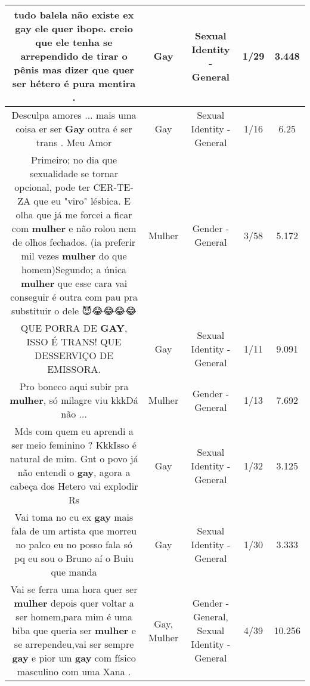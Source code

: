 \documentclass[11pt]{article}
\newlength\mylength
\begin{document}
\begin{center}
\begin{longtable}{|C{.65\mylength}|C{.30\mylength}|C{.12\mylength}|C{.12\mylength}|C{.12\mylength}|}
  \small tudo balela não existe ex \textbf{gay} ele quer ibope. creio que ele tenha se arrependido de tirar o pênis mas dizer que quer ser hétero é pura mentira .\normalsize   & Gay & Sexual Identity - General & 1/29 & 3.448 \\  \hline
  \small Desculpa amores ... mais uma coisa  er ser \textbf{Gay} outra é  ser trans . Meu Amor\normalsize   & Gay & Sexual Identity - General & 1/16 & 6.25 \\  \hline
  \small Primeiro; no dia que sexualidade se tornar opcional, pode ter CER-TE-ZA que eu "viro" lésbica. E olha que já me forcei a ficar com \textbf{mulher} e não rolou nem de olhos fechados. (ia preferir mil vezes \textbf{mulher} do que homem)Segundo; a única \textbf{mulher} que esse cara vai conseguir é outra com pau pra substituir o dele 😈😂😂😂😂\normalsize   & Mulher & Gender - General & 3/58 & 5.172 \\  \hline
  \small QUE PORRA DE \textbf{GAY}, ISSO É TRANS! QUE DESSERVIÇO DE EMISSORA.\normalsize   & Gay & Sexual Identity - General & 1/11 & 9.091 \\  \hline
  \small Pro boneco aqui subir pra \textbf{mulher}, só milagre viu kkkDá não ...\normalsize   & Mulher & Gender - General & 1/13 & 7.692 \\  \hline
  \small Mds com quem eu aprendi a ser meio feminino ? KkkIsso é natural de mim. Gnt o povo já não entendi o \textbf{gay}, agora a cabeça dos Hetero vai explodir Rs\normalsize   & Gay & Sexual Identity - General & 1/32 & 3.125 \\  \hline
  \small Vai toma no cu ex \textbf{gay} mais fala de um artista que morreu no palco eu no posso fala só pq eu sou o Bruno aí o Buiu que manda\normalsize   & Gay & Sexual Identity - General & 1/30 & 3.333 \\  \hline
  \small Vai se ferra uma hora quer ser \textbf{mulher} depois quer voltar a ser homem,para mim é uma biba que queria ser \textbf{mulher} e se arrependeu,vai ser sempre \textbf{gay} e pior  um \textbf{gay} com físico masculino com uma Xana   .\normalsize   & Gay, Mulher & Gender - General, Sexual Identity - General & 4/39 & 10.256 \\  \hline

\end{longtable}
\end{center}
\end{document}
